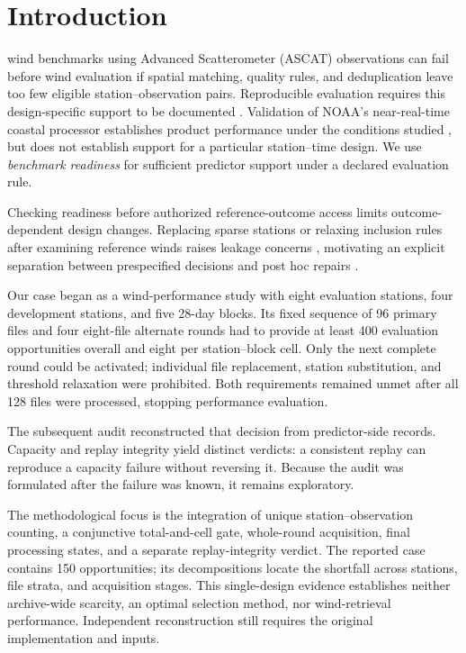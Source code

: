 \section{Introduction}
 wind benchmarks using Advanced Scatterometer (ASCAT) observations can fail before wind evaluation if spatial matching, quality rules, and deduplication leave too few eligible station--observation pairs. Reproducible evaluation requires this design-specific support to be documented \cite{kedron2022}. Validation of NOAA's near-real-time coastal processor establishes product performance under the conditions studied \cite{soisuvarn2023}, but does not establish support for a particular station--time design. We use \emph{benchmark readiness} for sufficient predictor support under a declared evaluation rule.

Checking readiness before authorized reference-outcome access limits outcome-dependent design changes. Replacing sparse stations or relaxing inclusion rules after examining reference winds raises leakage concerns \cite{kapoor2023}, motivating an explicit separation between prespecified decisions and post hoc repairs \cite{nosek2018}.

Our case began as a wind-performance study with eight evaluation stations, four development stations, and five 28-day blocks. Its fixed sequence of 96 primary files and four eight-file alternate rounds had to provide at least 400 evaluation opportunities overall and eight per station--block cell. Only the next complete round could be activated; individual file replacement, station substitution, and threshold relaxation were prohibited. Both requirements remained unmet after all 128 files were processed, stopping performance evaluation.

The subsequent audit reconstructed that decision from predictor-side records. Capacity and replay integrity yield distinct verdicts: a consistent replay can reproduce a capacity failure without reversing it. Because the audit was formulated after the failure was known, it remains exploratory.

The methodological focus is the integration of unique station--observation counting, a conjunctive total-and-cell gate, whole-round acquisition, final processing states, and a separate replay-integrity verdict. The reported case contains 150 opportunities; its decompositions locate the shortfall across stations, file strata, and acquisition stages. This single-design evidence establishes neither archive-wide scarcity, an optimal selection method, nor wind-retrieval performance. Independent reconstruction still requires the original implementation and inputs.
